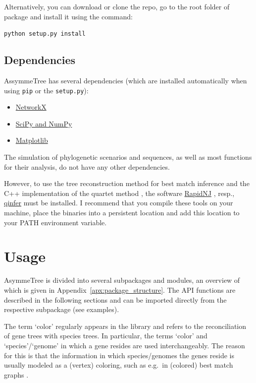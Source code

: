 \documentclass[hidelinks,11pt]{article}
\newcommand{\COMMANDLINE}[1]{\begingroup\par\vspace{3mm}\color{darkgrey}\begin{adjustwidth}{1cm}{1cm}\texttt{#1}\end{adjustwidth}\vspace{3mm}\endgroup}
\begin{document}
Alternatively, you can download or clone the repo, go to the root folder of package and install it using the command:

\COMMANDLINE{python setup.py install}


\subsection{Dependencies}

AssymmeTree has several dependencies (which are installed automatically when using \texttt{pip} or the \texttt{setup.py}):

\begin{itemize}
	\item \href{https://networkx.github.io}{NetworkX}
	\item \href{http://www.scipy.org/install.html}{SciPy and NumPy}
	\item \href{https://matplotlib.org/}{Matplotlib}
\end{itemize}

The simulation of phylogenetic scenarios and sequences, as well as most 
functions for their analysis, do not have any other dependencies.

However,
to use the tree reconstruction method for best match inference and the C++ 
implementation of the quartet method \citep{stadler2020}, the software 
\href{https://birc.au.dk/software/rapidnj/}{RapidNJ} \citep{simonsen2008}, 
resp., \href{https://github.com/david-schaller/qinfer}{qinfer} must be 
installed.
I recommend that you compile these tools on your machine, place the binaries 
into a persistent location and add this location to your PATH environment 
variable.



\section{Usage}

AsymmeTree is divided into several subpackages and modules, an overview of which is given in Appendix~\ref{apx:package_structure}.
The API functions are described in the following sections and can be imported 
directly from the respective subpackage (see examples).

The term `color' regularly appears in the library and refers to the reconciliation of gene trees with species trees.
In particular, the terms `color' and `species'/`genome' in which a gene resides are used interchangeably.
The reason for this is that the information in which species/genomes the genes 
reside is usually modeled as a (vertex) coloring, such as e.g.\ in (colored) 
best match graphs \citep{geiss2019a}.
\end{document}
